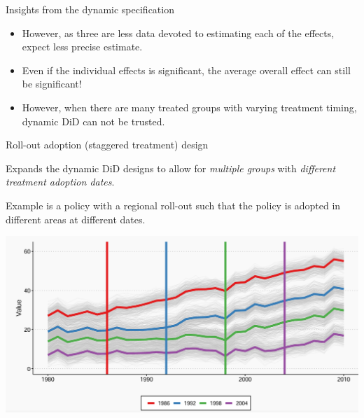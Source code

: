 \documentclass[notes,11pt, aspectratio=169]{beamer}
\newenvironment{wideitemize}{\itemize\addtolength{\itemsep}{10pt}}{\enditemize}
\begin{document}
\begin{frame}{Insights from the dynamic specification}
\begin{itemize}
\item However, as three are less data devoted to estimating each of the effects, expect less precise estimate.
\item Even if the individual effects is significant, the average overall effect can still be significant!  
\item However, when there are many treated groups with varying treatment timing, dynamic DiD can not be trusted.

\end{itemize}
\end{frame}


\begin{frame}{Roll-out adoption (staggered treatment) design}
      \begin{wideitemize}
          \item Expands the dynamic DiD designs to allow for \textit{multiple groups} with \textit{different treatment adoption dates}. \item Example is a policy with a regional roll-out such that the policy is adopted in different areas at different dates.
\vspace{1cm}
    \begin{center}
        \includegraphics[width=0.6\linewidth]{24_DiDLecture/24_DiDLecture_StaggeredRollout.png}
    \end{center}
          
      \end{wideitemize}
\end{frame}
\end{document}
